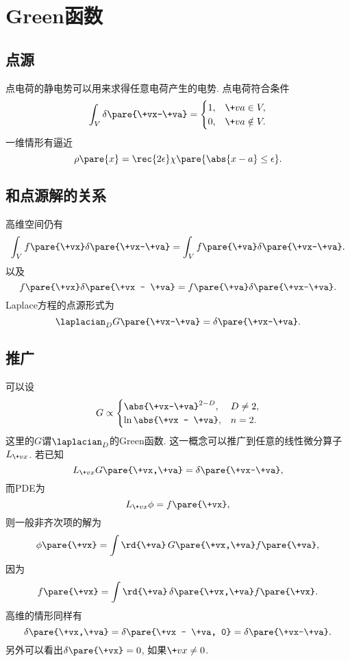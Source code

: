 \documentclass[hidelinks]{ctexart}
\begin{document}
\section{Green函数} %
\label{sec:green函数}

\subsection{点源} %
\label{sub:点源}

\newpoint{}点电荷的静电势可以用来求得任意电荷产生的电势.
\newpoint{}点电荷符合条件
\[ \int_V \delta\pare{\+vx-\+va} = \begin{cases}
    1, & \+va\in V, \\
    0, & \+va\notin V.
\end{cases} \]
\newpoint{}一维情形有逼近
\[ \rho\pare{x} = \rec{2\epsilon}\chi\pare{\abs{x-a}\le \epsilon}. \]


\subsection{和点源解的关系} %
\label{sub:和点源解的关系}

高维空间仍有
\[ \int_V f\pare{\+vx} \delta\pare{\+vx-\+va} = \int_V f\pare{\+va}\delta\pare{\+vx-\+va}. \]
以及
\[ f\pare{\+vx} \delta\pare{\+vx - \+va} = f\pare{\+va}\delta\pare{\+vx-\+va}. \]
Laplace方程的点源形式为
\[ \laplacian_D G\pare{\+vx-\+va} = \delta\pare{\+vx-\+va}. \]


\subsection{推广} %
\label{sub:推广}

可以设
\[ G\propto \begin{cases}
    \abs{\+vx-\+va}^{2-D}, & D\neq 2, \\
    \ln \abs{\+vx - \+va}, & n=2.
\end{cases} \]
这里的$G$谓$\laplacian_D$的Green函数. 这一概念可以推广到任意的线性微分算子$L_{\+vx}$. 若已知
\[ L_{\+vx}G\pare{\+vx,\+va} = \delta\pare{\+vx-\+va}, \]
而PDE为
\[ L_{\+vx}\phi = f\pare{\+vx}, \]
则一般非齐次项的解为
\[ \phi\pare{\+vx} = \int \rd{\+va}\, G\pare{\+vx,\+va}f\pare{\+va}, \]
因为
\[ f\pare{\+vx} = \int \rd{\+va}\, \delta\pare{\+vx,\+va}f\pare{\+vx}. \]
高维的情形同样有
\[ \delta\pare{\+vx,\+va} = \delta\pare{\+vx - \+va, 0} = \delta\pare{\+vx-\+va}. \]
另外可以看出$\delta\pare{\+vx} = 0$, 如果$\+vx\neq 0$.
\end{document}
